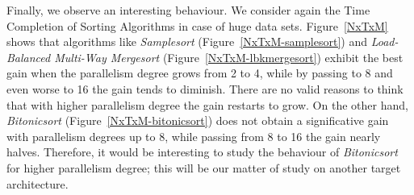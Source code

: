 Finally, we observe an interesting behaviour. We consider again the Time Completion of Sorting Algorithms in case of huge data sets. Figure~\ref{NxTxM} shows that algorithms like \textit{Samplesort} (Figure~\ref{NxTxM-samplesort}) and \textit{Load-Balanced Multi-Way Mergesort} (Figure~\ref{NxTxM-lbkmergesort}) exhibit the best gain when the parallelism degree grows from 2 to 4, while by passing to 8 and even worse to 16 the gain tends to diminish. There are no valid reasons to think that with higher parallelism degree the gain restarts to grow. On the other hand, \textit{Bitonicsort} (Figure~\ref{NxTxM-bitonicsort}) does not obtain a significative gain with parallelism degrees up to 8, while passing from 8 to 16 the gain nearly halves. Therefore, it would be interesting to study the behaviour of \textit{Bitonicsort} for higher parallelism degree; this will be our matter of study on another target architecture.


